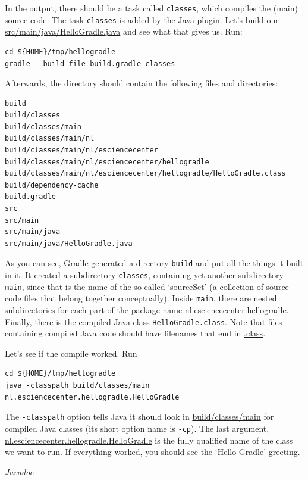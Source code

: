 \documentclass[12pt, a4paper, twoside,openany,titlepage]{article}
\begin{document}
In the output, there should be a task called \texttt{classes}, which compiles the (main) source code. The task \texttt{classes} is added by the Java plugin. Let's build our \url{src/main/java/HelloGradle.java} and see what that gives us. Run:
\begin{lstlisting}[style=basic,style=bash]
cd ${HOME}/tmp/hellogradle
gradle --build-file build.gradle classes
\end{lstlisting} %
Afterwards, the directory should contain the following files and directories:
\begin{lstlisting}[style=basic,style=bash]
build
build/classes
build/classes/main
build/classes/main/nl
build/classes/main/nl/esciencecenter
build/classes/main/nl/esciencecenter/hellogradle
build/classes/main/nl/esciencecenter/hellogradle/HelloGradle.class
build/dependency-cache
build.gradle
src
src/main
src/main/java
src/main/java/HelloGradle.java
\end{lstlisting}
As you can see, Gradle generated a directory \texttt{build} and put all the things it built in it. It created a subdirectory \texttt{classes}, containing yet another subdirectory \texttt{main}, since that is the name of the so-called \mbox{`sourceSet'} (a collection of source code files that belong together conceptually). Inside \texttt{main}, there are nested subdirectories for each part of the package name \url{nl.esciencecenter.hellogradle}. Finally, there is the compiled Java class \texttt{HelloGradle.class}. Note that files containing compiled Java code should have filenames that end in \url{.class}.

Let's see if the compile worked. Run
\begin{lstlisting}[style=basic,style=bash]
cd ${HOME}/tmp/hellogradle
java -classpath build/classes/main nl.esciencecenter.hellogradle.HelloGradle
\end{lstlisting} %
The \texttt{-classpath} option tells Java it should look in \url{build/classes/main} for compiled Java classes (its short option name is \texttt{-cp}). The last argument, \url{nl.esciencecenter.hellogradle.HelloGradle} is the fully qualified name of the class we want to run. If everything worked, you should see the `Hello Gradle' greeting.

\vspace{2em}
\textit{Javadoc}
\end{document}
